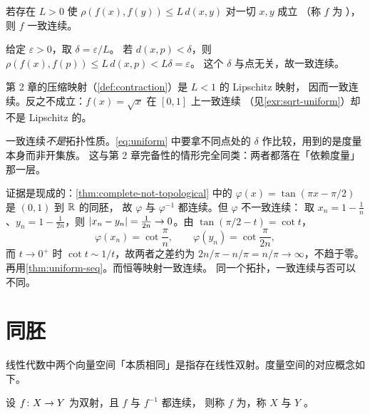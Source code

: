 \begin{example}
  \label{ex:lipschitz}
  若存在 \(L>0\) 使 \(\rho(f(x),f(y)) \le L\,d(x,y)\) 对一切 \(x,y\) 成立
  （称 \(f\) 为 ），则 \(f\) 一致连续。
  \begin{worked}
    给定 \(\varepsilon>0\)，取 \(\delta = \varepsilon/L\)。
    若 \(d(x,p)<\delta\)，则 \(\rho(f(x),f(p)) \le L\,d(x,p) < L\delta = \varepsilon\)。
    这个 \(\delta\) 与点无关，故一致连续。

    第 2 章的压缩映射（\cref{def:contraction}）是 \(L<1\) 的 Lipschitz 映射，
    因而一致连续。反之不成立：\(f(x)=\sqrt{x}\) 在 \([0,1]\) 上一致连续
    （见\cref{exr:sqrt-uniform}）却不是 Lipschitz 的。
  \end{worked}
\end{example}

\begin{remark}
  一致连续\emph{不是}拓扑性质。\cref{eq:uniform} 中要拿不同点处的
  \(\delta\) 作比较，用到的是度量本身而非开集族。
  这与第 2 章完备性的情形完全同类：两者都落在「依赖度量」那一层。

  证据是现成的：\cref{thm:complete-not-topological} 中的
  \(\varphi(x)=\tan(\pi x-\pi/2)\) 是 \((0,1)\) 到 \(\mathbb{R}\) 的同胚，
  故 \(\varphi\) 与 \(\varphi^{-1}\) 都连续。但 \(\varphi\) 不一致连续：
  取 \(x_{n} = 1-\frac{1}{n}\)、\(y_{n} = 1-\frac{1}{2n}\)，则
  \(\lvert x_{n}-y_{n}\rvert = \frac{1}{2n} \to 0\)。由 \(\tan(\pi/2-t) = \cot t\)，
  \[
    \varphi(x_{n}) = \cot\frac{\pi}{n}, \qquad
    \varphi(y_{n}) = \cot\frac{\pi}{2n} ,
  \]
  而 \(t \to 0^{+}\) 时 \(\cot t \sim 1/t\)，故两者之差约为
  \(2n/\pi - n/\pi = n/\pi \to \infty\)，不趋于零。
  再用\cref{thm:uniform-seq}。而恒等映射一致连续。
  同一个拓扑，一致连续与否可以不同。
\end{remark}

\section{同胚}
\label{sec:homeomorphism}

线性代数中两个向量空间「本质相同」是指存在线性双射。度量空间的对应概念如下。

\begin{definition}[同胚]
  \label{def:homeomorphism}
  设 \(f \colon X \to Y\) 为双射，且 \(f\) 与 \(f^{-1}\) 都连续，
  则称 \(f\) 为，称 \(X\) 与 \(Y\) 。
\end{definition}

